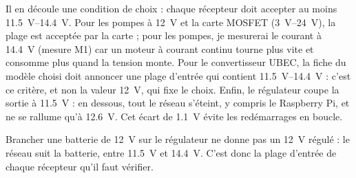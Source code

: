 Il en découle une condition de choix : chaque récepteur doit accepter au moins \qtyrange{11,5}{14,4}{V}. Pour les pompes à \qty{12}{V} et la carte MOSFET (\qtyrange{3}{24}{V}), la plage est acceptée par la carte ; pour les pompes, je mesurerai le courant à \qty{14,4}{V} (mesure M1) car un moteur à courant continu tourne plus vite et consomme plus quand la tension monte. Pour le convertisseur UBEC, la fiche du modèle choisi doit annoncer une plage d'entrée qui contient \qtyrange{11,5}{14,4}{V} : c'est ce critère, et non la valeur \qty{12}{V}, qui fixe le choix. Enfin, le régulateur coupe la sortie à \qty{11,5}{V} : en dessous, tout le réseau s'éteint, y compris le Raspberry Pi, et ne se rallume qu'à \qty{12,6}{V}. Cet écart de \qty{1,1}{V} évite les redémarrages en boucle.

\begin{aretenir}
Brancher une batterie de \qty{12}{V} sur le régulateur ne donne pas un \qty{12}{V} régulé : le réseau suit la batterie, entre \qty{11,5}{V} et \qty{14,4}{V}. C'est donc la plage d'entrée de chaque récepteur qu'il faut vérifier.
\end{aretenir}

